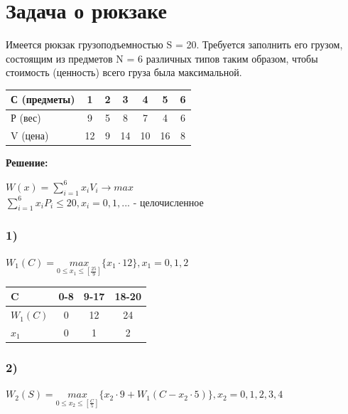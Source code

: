 \chapter{Задача о рюкзаке}

Имеется рюкзак грузоподъемностью S = 20. Требуется заполнить его грузом, состоящим из предметов N = 6 различных типов таким образом, чтобы стоимость (ценность) всего груза была максимальной.

\begin{center}
    \begin{tabular}{|a | c | c | c | c | c | c|} 
         \hline
            С (предметы) & 1 & 2 & 3 & 4 & 5 & 6\\
        \hline
            Р (вес) & 9 & 5 & 8 & 7 & 4 & 6 \\
         \hline
            V (цена) & 12 & 9 & 14 & 10 & 16 & 8 \\
         \hline
    \end{tabular}
\end{center}

\begin{center}
    {\bf
    Решение:}
\end{center}

\begin{center}
    $W(x) = \displaystyle \sum_{i=1}^{6} x_{i}V_{i} \rightarrow max$\\
    $\displaystyle \sum_{i=1}^{6} x_{i}P_{i} \le 20, x_{i} = 0, 1,...$ - целочисленное\\
\end{center}

\subsection*{1)}
$W_1 (C)=\underset{0\le x_1 \le [\frac{25}{9}]}{max}\{x_1\cdot 12\}, x_1=0,1,2$

\begin{center}
    \begin{tabular}{|a|c|c|c|}
    \hline 
    C & 0-8 & 9-17 & 18-20\\ \hline
    $W_1 (C)$ & 0 & 12 & 24\\ \hline
    $x_1$ & 0 & 1 & 2\\ \hline
    \end{tabular}
\end{center}


\subsection*{2)}
$W_2 (S)=\underset{0\le x_2 \le [\frac{C}{5}]}{max}\{x_2\cdot 9 + W_1(C-x_2\cdot 5)\}, x_2=0,1,2,3,4$

